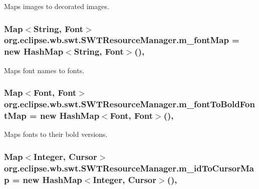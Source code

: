 Maps images to decorated images. \hypertarget{classorg_1_1eclipse_1_1wb_1_1swt_1_1_s_w_t_resource_manager_ab59ada91478162a9affc7bd230005487}{
\subsubsection[{m\-\_\-font\-Map}]{\setlength{\rightskip}{0pt plus 5cm}Map$<$String, Font$>$ org.\-eclipse.\-wb.\-swt.\-S\-W\-T\-Resource\-Manager.\-m\-\_\-font\-Map = new Hash\-Map$<$String, Font$>$()\hspace{0.3cm}{\ttfamily [static]}, {\ttfamily [private]}}}\label{classorg_1_1eclipse_1_1wb_1_1swt_1_1_s_w_t_resource_manager_ab59ada91478162a9affc7bd230005487}
Maps font names to fonts. \hypertarget{classorg_1_1eclipse_1_1wb_1_1swt_1_1_s_w_t_resource_manager_a8a49d99fd17a7c4fce84fe5beb13b01b}{
\subsubsection[{m\-\_\-font\-To\-Bold\-Font\-Map}]{\setlength{\rightskip}{0pt plus 5cm}Map$<$Font, Font$>$ org.\-eclipse.\-wb.\-swt.\-S\-W\-T\-Resource\-Manager.\-m\-\_\-font\-To\-Bold\-Font\-Map = new Hash\-Map$<$Font, Font$>$()\hspace{0.3cm}{\ttfamily [static]}, {\ttfamily [private]}}}\label{classorg_1_1eclipse_1_1wb_1_1swt_1_1_s_w_t_resource_manager_a8a49d99fd17a7c4fce84fe5beb13b01b}
Maps fonts to their bold versions. \hypertarget{classorg_1_1eclipse_1_1wb_1_1swt_1_1_s_w_t_resource_manager_af23f14e130154fba7d494c9276f7f4b1}{
\subsubsection[{m\-\_\-id\-To\-Cursor\-Map}]{\setlength{\rightskip}{0pt plus 5cm}Map$<$Integer, Cursor$>$ org.\-eclipse.\-wb.\-swt.\-S\-W\-T\-Resource\-Manager.\-m\-\_\-id\-To\-Cursor\-Map = new Hash\-Map$<$Integer, Cursor$>$()\hspace{0.3cm}{\ttfamily [static]}, {\ttfamily [private]}}}\label{classorg_1_1eclipse_1_1wb_1_1swt_1_1_s_w_t_resource_manager_af23f14e130154fba7d494c9276f7f4b1}
